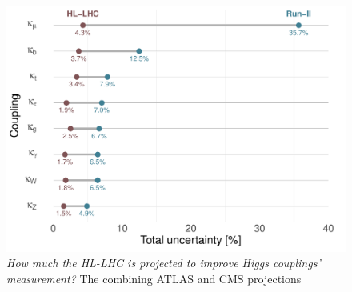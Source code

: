 \begin{figure}[htb!]
	\begin{center}
		\includegraphics[height=0.35\textheight]{figures/run2-hl-dumble}
		\caption{ \textit{How much the HL-LHC is projected to improve Higgs couplings' measurement?}  The combining ATLAS and CMS projections }	
		\label{fig:couplings-hlhlc}
	\end{center}
\end{figure}


